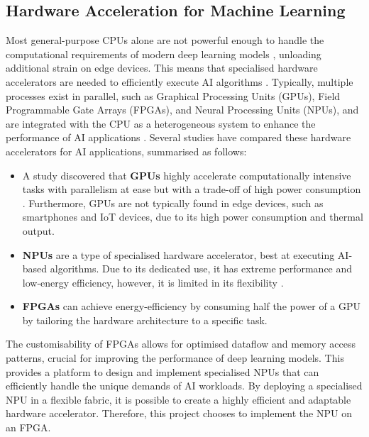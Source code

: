 \documentclass[12pt, a4paper, ukenglish]{article}
\begin{document}
    \subsection{Hardware Acceleration for Machine Learning} \label{sec: hardware accel}
    Most general-purpose CPUs alone are not powerful enough to handle the computational requirements of modern deep learning models \cite{zhang_energy-efficient_2022}, unloading additional strain on edge devices. This means that specialised hardware accelerators are needed to efficiently execute AI algorithms \cite{manor_custom_2022}. Typically, multiple processes exist in parallel, such as Graphical Processing Units (GPUs), Field Programmable Gate Arrays (FPGAs), and Neural Processing Units (NPUs), and are integrated with the CPU as a heterogeneous system  to enhance the performance of AI applications \cite{manor_custom_2022}. Several studies have compared these hardware accelerators for AI applications, summarised as follows:
    \begin{itemize}
        \item A study discovered that \textbf{GPUs} highly accelerate computationally intensive tasks with parallelism at ease but with a trade-off of high power consumption \cite{oh_investigation_2017}. Furthermore, GPUs are not typically found in edge devices, such as smartphones and IoT devices, due to its high power consumption and thermal output. 
        \item \textbf{NPUs} are a type of specialised hardware accelerator, best at executing AI-based algorithms. Due to its dedicated use, it has extreme performance and low-energy efficiency, however, it is limited in its flexibility \cite{tiwari_design_2022}.
        \item \textbf{FPGAs} can achieve energy-efficiency by consuming half the power of a GPU \cite{liu_energy-efficient_2024} by tailoring the hardware architecture to a specific task. 
    \end{itemize}

    The customisability of FPGAs allows for optimised dataflow and memory access patterns, crucial for improving the performance of deep learning models. This provides a platform to design and implement specialised NPUs that can efficiently handle the unique demands of AI workloads. By deploying a specialised NPU in a flexible fabric, it is possible to create a highly efficient and adaptable hardware accelerator. Therefore, this project chooses to implement the NPU on an FPGA.
\end{document}
